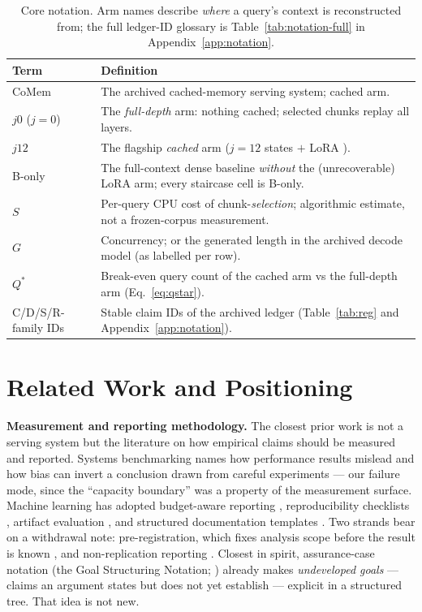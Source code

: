 \documentclass{article}
\begin{document}
\begin{table}[t]
\centering
\caption{Core notation. Arm names describe \emph{where} a query's context is reconstructed
from; the full ledger-ID glossary is Table~\ref{tab:notation-full} in
Appendix~\ref{app:notation}.}
\label{tab:notation}
\footnotesize
\setlength{\tabcolsep}{3pt}
\begin{tabular}{@{}>{\raggedright\arraybackslash}p{1.7cm}>{\raggedright\arraybackslash}p{11.7cm}@{}}
\toprule
\textbf{Term} & \textbf{Definition} \\
\midrule
CoMem & The archived cached-memory serving system; cached arm. \\
$j0$ ($j{=}0$) & The \emph{full-depth} arm: nothing cached; selected chunks replay all layers. \\
$j12$ & The flagship \emph{cached} arm ($j{=}12$ states $+$ LoRA \citep{hu2022lora}). \\
B-only & The full-context dense baseline \emph{without} the (unrecoverable) LoRA arm; every
staircase cell is B-only. \\
$S$ & Per-query CPU cost of chunk-\emph{selection}; algorithmic estimate, not a frozen-corpus
measurement. \\
$G$ & Concurrency; or the generated length in the archived decode model (as labelled per row). \\
$Q^{*}$ & Break-even query count of the cached arm vs the full-depth arm
(Eq.~\ref{eq:qstar}). \\
C/D/S/R-family IDs & Stable claim IDs of the archived ledger (Table~\ref{tab:reg} and
Appendix~\ref{app:notation}). \\
\bottomrule
\end{tabular}
\end{table}

\section{Related Work and Positioning}\label{sec:related}

\textbf{Measurement and reporting methodology.} The closest prior work is not a serving system
but the literature on how empirical claims should be measured and reported. Systems
benchmarking names how performance results mislead \citep{hoefler2015benchmarking} and how bias
can invert a conclusion drawn from careful experiments \citep{mytkowicz2009wrongdata} --- our
failure mode, since the ``capacity boundary'' was a property of the measurement surface.
Machine learning has adopted budget-aware reporting \citep{dodge2019showyourwork},
reproducibility checklists \citep{pineau2021reproducibility}, artifact evaluation
\citep{krishnamurthi2015repeatability}, and structured documentation templates
\citep{gebru2021datasheets,mitchell2019modelcards}. Two strands bear on a withdrawal note:
pre-registration, which fixes analysis scope before the result is known
\citep{nosek2018preregistration}, and non-replication reporting
\citep{dacrema2019progress,kapoor2023leakage}. Closest in spirit, assurance-case notation (the
Goal Structuring Notation; \citealp{kelly2004gsn}) already makes \emph{undeveloped goals} ---
claims an argument states but does not yet establish --- explicit in a structured tree. That
idea is not new.
\end{document}
